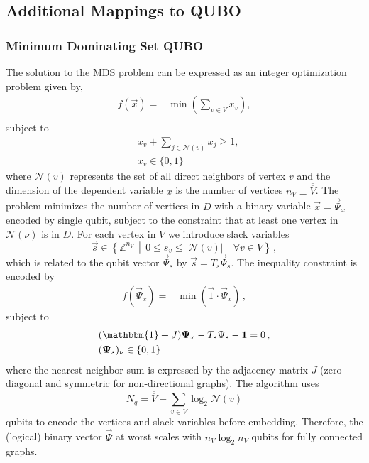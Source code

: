 \documentclass[10pt]{iopart}
\begin{document}
\subsection{Additional Mappings to QUBO}
\label{sec:methods:ILP-to-QUBO}
\subsubsection{Minimum Dominating Set QUBO}
\label{sec:methods:mds-qubo}

The solution to the MDS problem can be expressed as an integer optimization problem given by,
\begin{align}
 f(\vec x) = & \min\left(\sum_{v \in V} x_v\right),                    \\
\end{align}
subject to
\begin{align}
 & x_v + \sum_{j \in \mathcal{N}(v)} x_j \geq 1, \\
 & x_v \in \{0, 1\}
\end{align}
where $\mathcal{N}(v)$ represents the set of all direct neighbors of vertex $v$ and the dimension of the dependent variable $x$ is the number of vertices $n_V \equiv \overline{\overline{V}}$.
The problem minimizes the number of vertices in $D$ with a binary variable $\vec x = \vec \Psi_x$ encoded by single qubit, subject to the constraint that at least one vertex in $\mathcal{N}(\nu)$ is in $D$.
For each vertex in $V$ we introduce slack variables
\begin{equation}
    \vec s \in \left\{ \mathbb{Z}^{n_V} \, \middle| \, 0 \leq s_{v} \leq |\mathcal{N}(v)| \quad \forall v\in V \right\} \, ,
\end{equation}
which is related to the qubit vector $\vec \Psi_s$ by $\vec s = T_s \vec \Psi_s$.
The inequality constraint is encoded by
\begin{align}
 f(\vec \Psi_x)
 =
 & \min\left(\vec 1 \cdot \vec \Psi_x \right) \, ,
\end{align}
subject to
\begin{align}
 &
 (\mathbbm{1} + J)\vec \Psi_x - T_s \Psi_s  - \vec 1 = 0\,,
 \\
 &
 (\vec \Psi_s)_\nu \in \{ 0, 1\}
\end{align}
where the nearest-neighbor sum is expressed by the adjacency matrix $J$ (zero diagonal and symmetric for non-directional graphs).
The algorithm uses
\begin{equation}
    N_q = \overline{\overline{V}} + \sum_{v \in V} \log_2 \mathcal{N}(v)
\end{equation}
qubits to encode the vertices and slack variables before embedding.
Therefore, the (logical) binary vector $\vec \Psi$ at worst scales with $n_V \log_2 n_V$ qubits for fully connected graphs.
\end{document}
